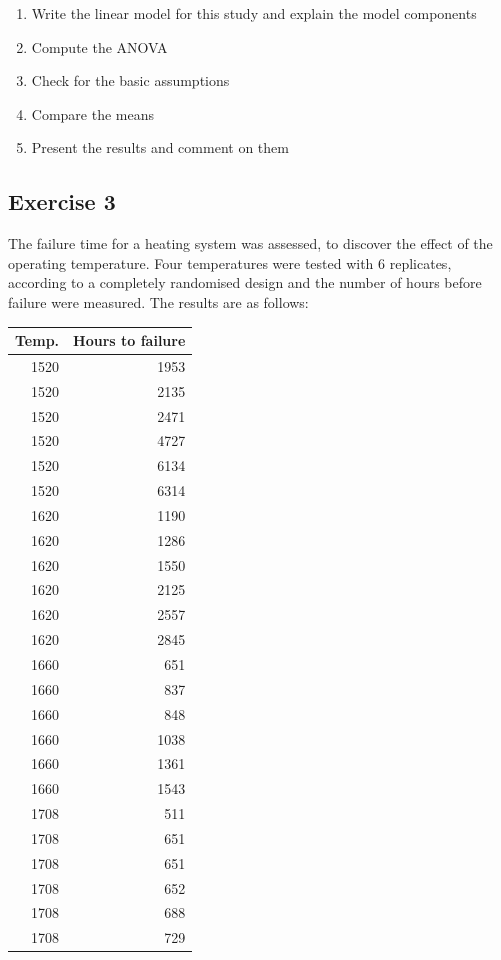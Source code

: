 \documentclass[a4paper,12pt,oneside]{book}
\providecommand{\tightlist}{%
  \setlength{\itemsep}{0pt}\setlength{\parskip}{0pt}}
\begin{document}
\begin{enumerate}
\def\labelenumi{\arabic{enumi}.}
\tightlist
\item
  Write the linear model for this study and explain the model components
\item
  Compute the ANOVA
\item
  Check for the basic assumptions
\item
  Compare the means
\item
  Present the results and comment on them
\end{enumerate}

\hypertarget{exercise-3-4}{%
\subsection{Exercise 3}\label{exercise-3-4}}

The failure time for a heating system was assessed, to discover the effect of the operating temperature. Four temperatures were tested with 6 replicates, according to a completely randomised design and the number of hours before failure were measured.
The results are as follows:

\begin{longtable}[]{@{}rr@{}}
\toprule
Temp. & Hours to failure \\
\midrule
\endhead
1520 & 1953 \\
1520 & 2135 \\
1520 & 2471 \\
1520 & 4727 \\
1520 & 6134 \\
1520 & 6314 \\
1620 & 1190 \\
1620 & 1286 \\
1620 & 1550 \\
1620 & 2125 \\
1620 & 2557 \\
1620 & 2845 \\
1660 & 651 \\
1660 & 837 \\
1660 & 848 \\
1660 & 1038 \\
1660 & 1361 \\
1660 & 1543 \\
1708 & 511 \\
1708 & 651 \\
1708 & 651 \\
1708 & 652 \\
1708 & 688 \\
1708 & 729 \\
\bottomrule
\end{longtable}
\end{document}
